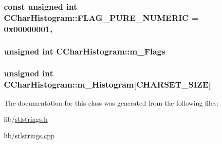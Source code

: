 \hypertarget{classCCharHistogram_af672d0091a521b09e29ac4360441008e}{
\subsubsection[{F\-L\-A\-G\-\_\-\-P\-U\-R\-E\-\_\-\-N\-U\-M\-E\-R\-I\-C}]{\setlength{\rightskip}{0pt plus 5cm}const unsigned int C\-Char\-Histogram\-::\-F\-L\-A\-G\-\_\-\-P\-U\-R\-E\-\_\-\-N\-U\-M\-E\-R\-I\-C = 0x00000001\hspace{0.3cm}{\ttfamily [static]}, {\ttfamily [private]}}}\label{classCCharHistogram_af672d0091a521b09e29ac4360441008e}
\hypertarget{classCCharHistogram_a043e57dff1e0d698e3a9c6b39a1c69ba}{
\subsubsection[{m\-\_\-\-Flags}]{\setlength{\rightskip}{0pt plus 5cm}unsigned int C\-Char\-Histogram\-::m\-\_\-\-Flags\hspace{0.3cm}{\ttfamily [protected]}}}\label{classCCharHistogram_a043e57dff1e0d698e3a9c6b39a1c69ba}
\hypertarget{classCCharHistogram_a76d704b2eb9941abfe14acd56b064543}{
\subsubsection[{m\-\_\-\-Histogram}]{\setlength{\rightskip}{0pt plus 5cm}unsigned int C\-Char\-Histogram\-::m\-\_\-\-Histogram\mbox{[}{\bf C\-H\-A\-R\-S\-E\-T\-\_\-\-S\-I\-Z\-E}\mbox{]}\hspace{0.3cm}{\ttfamily [protected]}}}\label{classCCharHistogram_a76d704b2eb9941abfe14acd56b064543}


The documentation for this class was generated from the following files\-:\begin{DoxyCompactItemize}
\item 
lib/\hyperlink{stlstrings_8h}{stlstrings.\-h}\item 
lib/\hyperlink{stlstrings_8cpp}{stlstrings.\-cpp}\end{DoxyCompactItemize}
